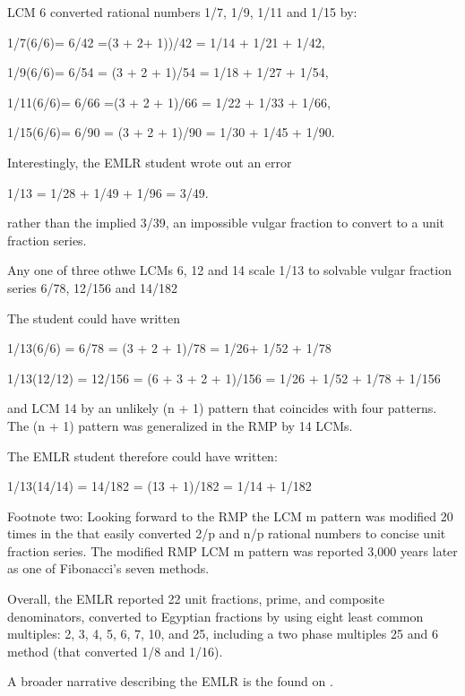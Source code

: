 \documentclass[12pt]{article}
\begin{document}
LCM 6 converted rational numbers 1/7, 1/9, 1/11 and 1/15 by:

1/7(6/6)= 6/42 =(3 + 2+ 1))/42 = 1/14 + 1/21 + 1/42,

1/9(6/6)= 6/54 = (3 +  2 + 1)/54 = 1/18 + 1/27 + 1/54,

1/11(6/6)= 6/66 =(3 + 2 + 1)/66 = 1/22 + 1/33 + 1/66,

1/15(6/6)= 6/90 = (3 + 2 + 1)/90 = 1/30 + 1/45 + 1/90.

Interestingly, the EMLR student wrote out an error 

1/13 = 1/28 + 1/49 + 1/96 = 3/49.

rather than the implied 3/39, an impossible vulgar fraction to convert to a unit fraction series. 

Any one of three othwe LCMs 6, 12 and 14 scale 1/13 to solvable vulgar fraction series 6/78, 12/156 and 14/182

The student could have written 

1/13(6/6) = 6/78 = (3 + 2 + 1)/78 = 1/26+ 1/52 + 1/78

1/13(12/12) = 12/156 = (6 + 3 + 2 + 1)/156 = 1/26 + 1/52 + 1/78 + 1/156 

and LCM 14 by an unlikely (n + 1) pattern that coincides with four  patterns. The (n + 1) pattern was generalized in the RMP by 14 LCMs.

The EMLR student therefore could have written:

1/13(14/14) = 14/182 = (13 + 1)/182 = 1/14 + 1/182

Footnote two: Looking forward to the RMP the LCM m pattern was modified 20 times in the  that easily converted 2/p and n/p rational numbers to concise unit fraction series.  The modified RMP  LCM m pattern was reported 3,000 years later as one of Fibonacci's seven  methods.

Overall, the EMLR reported 22 unit fractions, prime, and composite denominators, converted to Egyptian fractions by using eight least common multiples: 2, 3, 4, 5, 6, 7, 10, and 25, including a two phase multiples 25 and 6 method (that converted 1/8 and 1/16). 

A broader narrative describing the EMLR is the found on .
\end{document}
